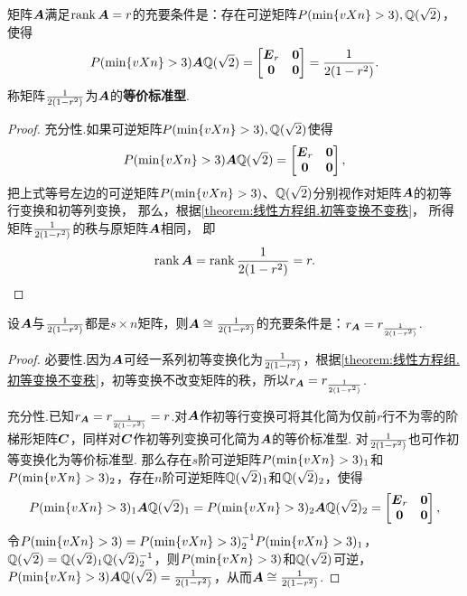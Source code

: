 \begin{theorem}
矩阵\(\A\)满足\(\rank\A=r\)的充要条件是：存在可逆矩阵\(\P,\Q\)，使得\[
\P \A \Q = \begin{bmatrix}
\E_r & \z \\ \z & \z
\end{bmatrix} = \B.
\]\rm
称矩阵\(\B\)为\(\A\)的\textbf{等价标准型}.
\begin{proof}
充分性.如果可逆矩阵\(\P,\Q\)使得\[
\P\A\Q = \begin{bmatrix}
\E_r & \z \\ \z & \z
\end{bmatrix},
\]
把上式等号左边的可逆矩阵\(\P\)、\(\Q\)分别视作对矩阵\(\A\)的初等行变换和初等列变换，%
那么，根据\cref{theorem:线性方程组.初等变换不变秩}，%
所得矩阵\(\B\)的秩与原矩阵\(\A\)相同，%
即\[
\rank\A = \rank\B = r.
\qedhere
\]
\end{proof}
\end{theorem}

\begin{theorem}
设\(\A\)与\(\B\)都是\(s \times n\)矩阵，则\(\A \cong \B\)的充要条件是：\(r_{\A} = r_{\B}\).
\begin{proof}
必要性.因为\(\A\)可经一系列初等变换化为\(\B\)，根据\cref{theorem:线性方程组.初等变换不变秩}，初等变换不改变矩阵的秩，所以\(r_{\A} = r_{\B}\).

充分性.已知\(r_{\A} = r_{\B} = r\).对\(\A\)作初等行变换可将其化简为仅前\(r\)行不为零的阶梯形矩阵\(\C\)，同样对\(\C\)作初等列变换可化简为\(\A\)的等价标准型.
对\(\B\)也可作初等变换化为等价标准型.
那么存在\(s\)阶可逆矩阵\(\P_1\)和\(\P_2\)，存在\(n\)阶可逆矩阵\(\Q_1\)和\(\Q_2\)，使得\[
\P_1 \A \Q_1 = \P_2 \A \Q_2 = \begin{bmatrix} \E_r & \z \\ \z & \z \end{bmatrix},
\]令\(\P = \P_2^{-1} \P_1\)，\(\Q = \Q_1 \Q_2^{-1}\)，则\(\P\)和\(\Q\)可逆，\(\P \A \Q = \B\)，从而\(\A \cong \B\).
\end{proof}
\end{theorem}


